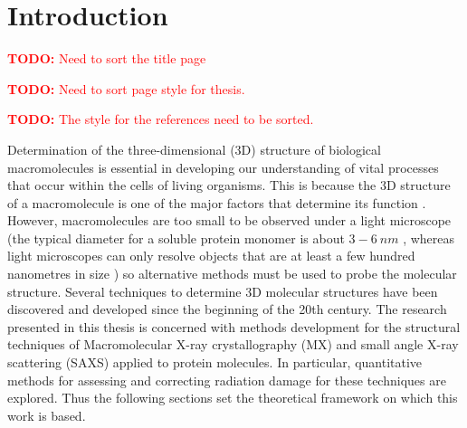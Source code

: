 \chapter{Introduction}
\label{chap:Introduction}
\textcolor{red}{
\begin{myenumerate}
    \item \hypertarget{todo:SortTitlePage}{\textbf{TODO:} Need to sort the title page}
    \item \hypertarget{todo:SortPageStyle}{\textbf{TODO:} Need to sort page style for thesis.}
    \item \hypertarget{todo:SortReferenceStyle}{\textbf{TODO:} The style for the references need to be sorted.}
\end{myenumerate}
}
Determination of the three-dimensional (3D) structure of biological macromolecules is essential in developing our understanding of vital processes that occur within the cells of living organisms.
This is because the 3D structure of a macromolecule is one of the major factors that determine its function \cite[s~3.6]{berg2002,hegyi1999}.
However, macromolecules are too small to be observed under a light microscope (the typical diameter for a soluble protein monomer is about $3-6\ nm$ \cite{Philips2015}, whereas light microscopes can only resolve objects that are at least a few hundred nanometres in size \cite[p~54]{starr2010}) so alternative methods must be used to probe the molecular structure.
Several techniques to determine 3D molecular structures have been discovered and developed since the beginning of the 20th century.
The research presented in this thesis is concerned with methods development for the structural techniques of Macromolecular X-ray crystallography (MX) and small angle X-ray scattering (SAXS) applied to protein molecules.
In particular, quantitative methods for assessing and correcting radiation damage for these techniques are explored.
Thus the following sections set the theoretical framework on which this work is based.
